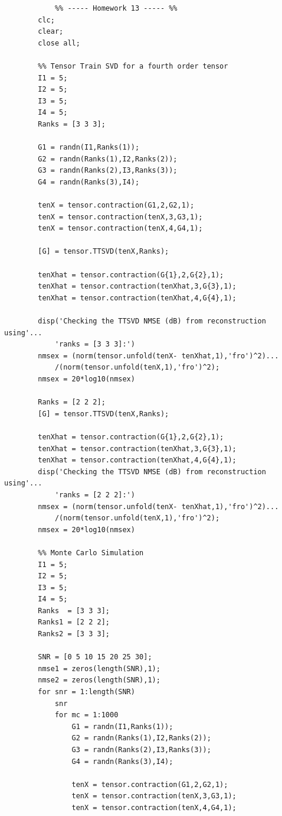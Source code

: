 \documentclass[a4paper,10pt]{article}
\begin{document}
\begin{verbatim}
            %% ----- Homework 13 ----- %%
        clc;
        clear;
        close all;

        %% Tensor Train SVD for a fourth order tensor
        I1 = 5;
        I2 = 5;
        I3 = 5;
        I4 = 5;
        Ranks = [3 3 3];

        G1 = randn(I1,Ranks(1));
        G2 = randn(Ranks(1),I2,Ranks(2));
        G3 = randn(Ranks(2),I3,Ranks(3));
        G4 = randn(Ranks(3),I4);

        tenX = tensor.contraction(G1,2,G2,1);
        tenX = tensor.contraction(tenX,3,G3,1);
        tenX = tensor.contraction(tenX,4,G4,1);

        [G] = tensor.TTSVD(tenX,Ranks);

        tenXhat = tensor.contraction(G{1},2,G{2},1);
        tenXhat = tensor.contraction(tenXhat,3,G{3},1);
        tenXhat = tensor.contraction(tenXhat,4,G{4},1);

        disp('Checking the TTSVD NMSE (dB) from reconstruction using'... 
            'ranks = [3 3 3]:')
        nmsex = (norm(tensor.unfold(tenX- tenXhat,1),'fro')^2)...
            /(norm(tensor.unfold(tenX,1),'fro')^2);
        nmsex = 20*log10(nmsex)

        Ranks = [2 2 2];
        [G] = tensor.TTSVD(tenX,Ranks);

        tenXhat = tensor.contraction(G{1},2,G{2},1);
        tenXhat = tensor.contraction(tenXhat,3,G{3},1);
        tenXhat = tensor.contraction(tenXhat,4,G{4},1);
        disp('Checking the TTSVD NMSE (dB) from reconstruction using'... 
            'ranks = [2 2 2]:')
        nmsex = (norm(tensor.unfold(tenX- tenXhat,1),'fro')^2)...
            /(norm(tensor.unfold(tenX,1),'fro')^2);
        nmsex = 20*log10(nmsex)

        %% Monte Carlo Simulation
        I1 = 5;
        I2 = 5;
        I3 = 5;
        I4 = 5;
        Ranks  = [3 3 3];
        Ranks1 = [2 2 2];
        Ranks2 = [3 3 3];

        SNR = [0 5 10 15 20 25 30];
        nmse1 = zeros(length(SNR),1);
        nmse2 = zeros(length(SNR),1);
        for snr = 1:length(SNR)
            snr
            for mc = 1:1000
                G1 = randn(I1,Ranks(1));
                G2 = randn(Ranks(1),I2,Ranks(2));
                G3 = randn(Ranks(2),I3,Ranks(3));
                G4 = randn(Ranks(3),I4);

                tenX = tensor.contraction(G1,2,G2,1);
                tenX = tensor.contraction(tenX,3,G3,1);
                tenX = tensor.contraction(tenX,4,G4,1);


\end{verbatim}
\end{document}
